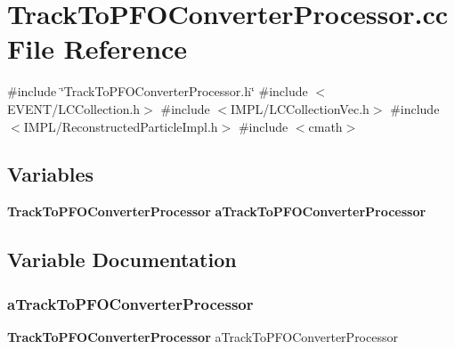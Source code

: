 \section{Track\+To\+P\+F\+O\+Converter\+Processor.\+cc File Reference}
\label{TrackToPFOConverterProcessor_8cc}
{\ttfamily \#include \char`\"{}Track\+To\+P\+F\+O\+Converter\+Processor.\+h\char`\"{}}\newline
{\ttfamily \#include $<$E\+V\+E\+N\+T/\+L\+C\+Collection.\+h$>$}\newline
{\ttfamily \#include $<$I\+M\+P\+L/\+L\+C\+Collection\+Vec.\+h$>$}\newline
{\ttfamily \#include $<$I\+M\+P\+L/\+Reconstructed\+Particle\+Impl.\+h$>$}\newline
{\ttfamily \#include $<$cmath$>$}\newline
\subsection*{Variables}
\begin{DoxyCompactItemize}
\item 
\textbf{ Track\+To\+P\+F\+O\+Converter\+Processor} \textbf{ a\+Track\+To\+P\+F\+O\+Converter\+Processor}
\end{DoxyCompactItemize}


\subsection{Variable Documentation}
\mbox{\label{TrackToPFOConverterProcessor_8cc_af0f5b841cb879fb54c57035f84df0197}} 
\subsubsection{a\+Track\+To\+P\+F\+O\+Converter\+Processor}
{\footnotesize\ttfamily \textbf{ Track\+To\+P\+F\+O\+Converter\+Processor} a\+Track\+To\+P\+F\+O\+Converter\+Processor}

